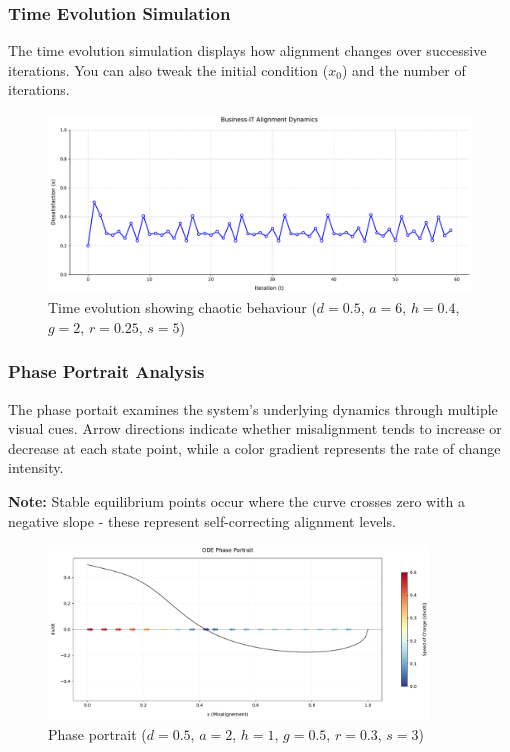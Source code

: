 \documentclass[a4paper, 10pt]{article}
\begin{document}
\subsubsection{Time Evolution Simulation}
The time evolution simulation displays how alignment changes over successive iterations.
You can also tweak the initial condition ($x_0$) and the number of iterations. 

\begin{figure}[h]
	\centering
	\includegraphics[width=1\textwidth]{../images/results/res-int-1.pdf}
	\caption{Time evolution showing chaotic behaviour ($d = 0.5$, $a = 6$, $h = 0.4$, $g = 2$, $r = 0.25$, $s = 5$)}
	\label{fig:time_sim}
\end{figure}

\subsubsection{Phase Portrait Analysis}
The phase portait examines the system's underlying dynamics through multiple visual cues. Arrow directions indicate whether misalignment tends to increase or decrease at each state point, while a color gradient represents the rate of change intensity.

\textbf{Note:} Stable equilibrium points occur where the curve crosses zero with a negative slope - these represent self-correcting alignment levels.

\begin{figure}[H]
	\centering
	\includegraphics[width=0.9\textwidth]{../images/results/res-int-2.pdf}
	\caption{Phase portrait ($d = 0.5$, $a = 2$, $h = 1$, $g = 0.5$, $r = 0.3$, $s = 3$)}
	\label{fig:phase_portrait}
\end{figure}
\end{document}
